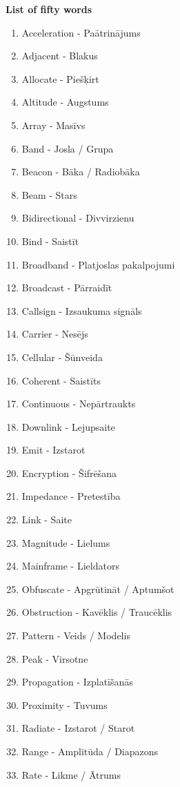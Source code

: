 \documentclass[a4paper, twoside, 12pt]{book}
\begin{document}
\vfill{}

\pagebreak

{\noindent \textbf{List of fifty words}}
\vspace{6pt}

\begin{enumerate}
	\setlength{\itemsep}{0pt}
	\item Acceleration -  Paātrinājums
	\item Adjacent - Blakus
	\item Allocate - Piešķirt
	\item Altitude - Augstums
	\item Array - Masīvs
	\item Band - Josla / Grupa
	\item Beacon - Bāka / Radiobāka
	\item Beam - Stars
	\item Bidirectional - Divvirzienu
	\item Bind - Saistīt
	\item Broadband - Platjoslas pakalpojumi
	\item Broadcast - Pārraidīt
	\item Callsign - Izsaukuma signāls
	\item Carrier - Nesējs
	\item Cellular - Šūnveida
	\item Coherent - Saistīts
	\item Continuous - Nepārtraukts
	\item Downlink - Lejupsaite
	\item Emit - Izstarot
	\item Encryption - Šifrēšana
	\item Impedance - Pretestība
	\item Link - Saite
	\item Magnitude - Lielums
	\item Mainframe - Lieldators
	\item Obfuscate - Apgrūtināt / Aptumšot
	\item Obstruction - Kavēklis / Traucēklis
	\item Pattern - Veids / Modelis
	\item Peak - Virsotne
	\item Propagation - Izplatīšanās
	\item Proximity - Tuvums
	\item Radiate - Izstarot / Starot
	\item Range - Amplitūda / Diapazons
	\item Rate - Likme / Ātrums

\end{enumerate}
\end{document}
